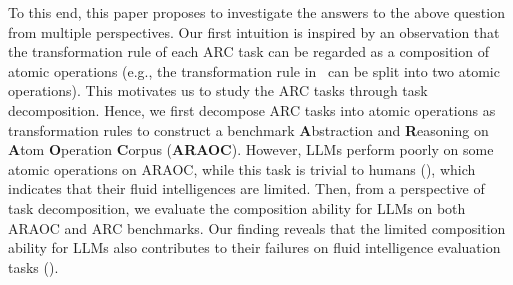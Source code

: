 To this end, this paper proposes to investigate the answers to the above question from multiple perspectives.
Our first intuition is inspired by an observation that the transformation rule of each ARC task can be regarded as a composition of atomic operations (e.g., the transformation rule in~ can be split into two atomic operations).
This motivates us to study the ARC tasks through task decomposition. Hence, we first decompose ARC tasks into atomic operations as transformation rules to construct a benchmark \textbf{A}bstraction and \textbf{R}easoning on \textbf{A}tom \textbf{O}peration  \textbf{C}orpus (\textbf{ARAOC}). However, LLMs perform poorly on some atomic operations on ARAOC, while this task is trivial to humans (), which indicates that their fluid intelligences are limited. Then, from a perspective of task decomposition, we %
evaluate the composition ability for LLMs on both ARAOC and ARC benchmarks. Our finding reveals that the limited composition ability for LLMs also contributes to their failures on fluid intelligence evaluation tasks (). 



